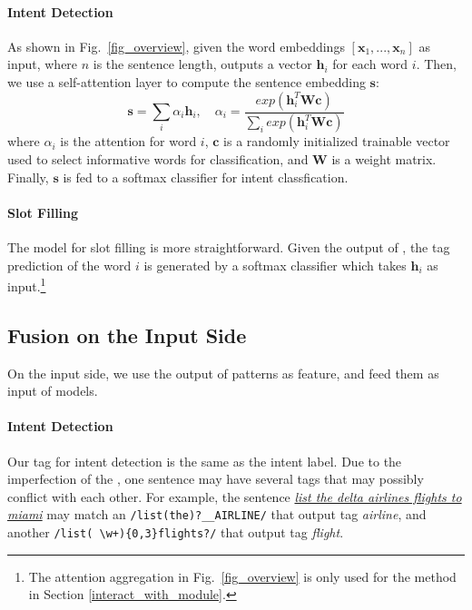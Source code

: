 \paragraph{Intent Detection}
As shown in Fig.~\ref{fig_overview}, given the word embeddings $[\textbf{x}_1, ..., \textbf{x}_n]$ as input, where $n$ is the sentence length, \BLSTM outputs a vector $\textbf{h}_i$ for each word $i$.
Then, we use a self-attention layer to compute the sentence embedding $\textbf{s}$:
\begin{equation}
\textbf{s} = \sum_{i}{\alpha_i\textbf{h}_i}, \quad \alpha_i=\frac{exp(\textbf{h}_i^T\textbf{Wc})}{\sum_{i}{exp(\textbf{h}_i^T\textbf{Wc})}}
\label{eq:simple_att}
\end{equation}
where  $\alpha_i$ is the attention for word $i$, $\textbf{c}$ is a randomly initialized trainable vector used to select informative words for classification, and $\textbf{W}$ is a weight matrix.
Finally, $\textbf{s}$ is fed to a softmax classifier for intent classfication.

\paragraph{Slot Filling}
The model for slot filling is more straightforward. Given the output of \BLSTM, the tag prediction of the word $i$ is generated by a
softmax classifier which takes $\textbf{h}_i$ as input.\footnote{The attention aggregation in Fig.~\ref{fig_overview} is only used for the
method in Section \ref{interact_with_module}.}


\subsection{Fusion on the Input Side}
\label{fusion_with_input}
On the input side, we use the output of \RE patterns as feature, and feed them as input of \NN models.
\paragraph{Intent Detection}
Our \RE tag for intent detection is the same as the intent label.
Due to the imperfection of the \REs, one sentence may have several \RE tags that may possibly conflict with each other.
For example, the sentence \textsl{\underline{list the delta airlines flights to miami}} may match an \RE \texttt{/list(\;the)?\;\_\_AIRLINE/} that output tag \emph{airline},
and another \RE \texttt{/list(\,\textbackslash w+)\{0,3\}\;flights?/} that output tag \emph{flight}.

